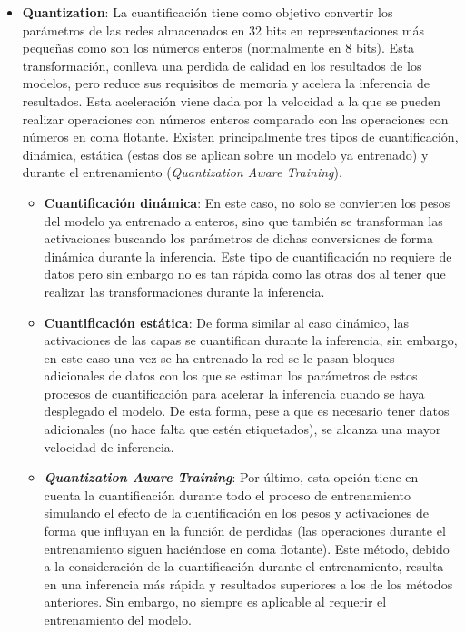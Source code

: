 \documentclass[a4paper, 11pt]{article}
\newcommand{\textbfit}[1]{\textbf{\textit{#1}}}
\begin{document}
\begin{itemize}
\begin{itemize}
    \end{itemize}
    \item \textbf{Quantization}: La cuantificación tiene como objetivo convertir los parámetros de las redes almacenados en 32 bits en representaciones más pequeñas como son los números enteros (normalmente en 8 bits). Esta transformación, conlleva una perdida de calidad en los resultados de los modelos, pero reduce sus requisitos de memoria y acelera la inferencia de resultados. Esta aceleración viene dada por la velocidad a la que se pueden realizar operaciones con números enteros comparado con las operaciones con números en coma flotante. Existen principalmente tres tipos de cuantificación, dinámica, estática (estas dos se aplican sobre un modelo ya entrenado) y durante el entrenamiento (\textit{Quantization Aware Training}).
    \begin{itemize}
        \item \textbf{Cuantificación dinámica}: En este caso, no solo se convierten los pesos del modelo ya entrenado a enteros, sino que también se transforman las activaciones buscando los parámetros de dichas conversiones de forma dinámica durante la inferencia. Este tipo de cuantificación no requiere de datos pero sin embargo no es tan rápida como las otras dos al tener que realizar las transformaciones durante la inferencia.
        \item \textbf{Cuantificación estática}: De forma similar al caso dinámico, las activaciones de las capas se cuantifican durante la inferencia, sin embargo, en este caso una vez se ha entrenado la red se le pasan bloques adicionales de datos con los que se estiman los parámetros de estos procesos de cuantificación para acelerar la inferencia cuando se haya desplegado el modelo. De esta forma, pese a que es necesario tener datos adicionales (no hace falta que estén etiquetados), se alcanza una mayor velocidad de inferencia.
        \item \textbfit{Quantization Aware Training}: Por último, esta opción tiene en cuenta la cuantificación durante todo el proceso de entrenamiento simulando el efecto de la cuentificación en los pesos y activaciones de forma que influyan en la función de perdidas (las operaciones durante el entrenamiento siguen haciéndose en coma flotante). Este método, debido a la consideración de la cuantificación durante el entrenamiento, resulta en una inferencia más rápida y resultados superiores a los de los métodos anteriores. Sin embargo, no siempre es aplicable al requerir el entrenamiento del modelo.

\end{itemize}
\end{itemize}
\end{document}
